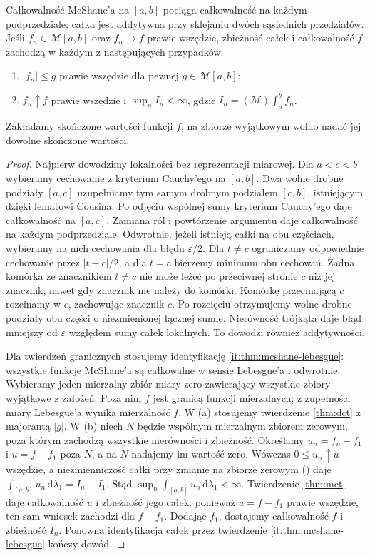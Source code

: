 \begin{wniosek}
\label{it:cor:mcshane-lebesgue-consequences}
Całkowalność McShane'a na $[a,b]$ pociąga całkowalność
na każdym podprzedziale; całka jest addytywna przy
sklejaniu dwóch sąsiednich przedziałów.
Jeśli $f_n\in\mathcal M[a,b]$ oraz $f_n\to f$ prawie
wszędzie, zbieżność całek i całkowalność $f$ zachodzą
w każdym z następujących przypadków:
\begin{enumerate}[label=(\alph*)]
\item $|f_n|\le g$ prawie wszędzie dla pewnej
$g\in\mathcal M[a,b]$;
\item $f_n\uparrow f$ prawie wszędzie i $\sup_n I_n<\infty$,
gdzie $I_n=(\mathcal M)\int_a^b f_n$.
\end{enumerate}
Zakładamy skończone wartości funkcji $f$; na zbiorze
wyjątkowym wolno nadać jej dowolne skończone wartości.
\end{wniosek}
\begin{proof}
Najpierw dowodzimy lokalności bez reprezentacji miarowej. Dla $a<c<b$ wybieramy cechowanie z kryterium Cauchy'ego na $[a,b]$. Dwa wolne drobne podziały $[a,c]$ uzupełniamy tym samym drobnym podziałem $[c,b]$, istniejącym dzięki lematowi Cousina. Po odjęciu wspólnej sumy kryterium Cauchy'ego daje całkowalność na $[a,c]$. Zamiana ról i powtórzenie argumentu daje całkowalność na każdym podprzedziale. Odwrotnie, jeżeli istnieją całki na obu częściach, wybieramy na nich cechowania dla błędu $\varepsilon/2$. Dla $t\ne c$ ograniczamy odpowiednie cechowanie przez $|t-c|/2$, a dla $t=c$ bierzemy minimum obu cechowań. Żadna komórka ze znacznikiem $t\ne c$ nie może leżeć po przeciwnej stronie $c$ niż jej znacznik, nawet gdy znacznik nie należy do komórki. Komórkę przecinającą $c$ rozcinamy w $c$, zachowując znacznik $c$. Po rozcięciu otrzymujemy wolne drobne podziały obu części o niezmienionej łącznej sumie. Nierówność trójkąta daje błąd mniejszy od $\varepsilon$ względem sumy całek lokalnych. To dowodzi również addytywności.

Dla twierdzeń granicznych stosujemy identyfikację \ref{it:thm:mcshane-lebesgue}: wszystkie funkcje McShane'a są całkowalne w sensie Lebesgue'a i odwrotnie. Wybieramy jeden mierzalny zbiór miary zero zawierający wszystkie zbiory wyjątkowe z założeń. Poza nim $f$ jest granicą funkcji mierzalnych; z zupełności miary Lebesgue'a wynika mierzalność $f$. W (a) stosujemy twierdzenie \ref{thm:dct} z majorantą $|g|$. W (b) niech $N$ będzie wspólnym mierzalnym zbiorem zerowym,
poza którym zachodzą wszystkie nierówności i zbieżność.
Określamy $u_n=f_n-f_1$ i $u=f-f_1$ poza $N$,
a na $N$ nadajemy im wartość zero. Wówczas $0\le u_n\uparrow u$
wszędzie, a niezmienniczość całki przy zmianie na zbiorze zerowym
()
daje $\int_{[a,b]}u_n\,\mathrm d\lambda_1=I_n-I_1$.
Stąd $\sup_n\int_{[a,b]}u_n\,\mathrm d\lambda_1<\infty$.
Twierdzenie \ref{thm:mct} daje całkowalność $u$ i zbieżność jego całek;
ponieważ $u=f-f_1$ prawie wszędzie, ten sam wniosek zachodzi dla
$f-f_1$. Dodając $f_1$, dostajemy całkowalność $f$ i zbieżność $I_n$.
Ponowna identyfikacja całek przez twierdzenie
\ref{it:thm:mcshane-lebesgue} kończy dowód.
\end{proof}

